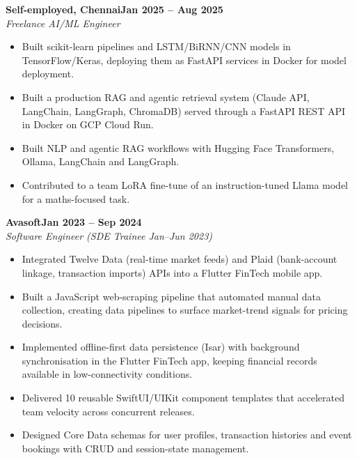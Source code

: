 \documentclass[a4paper,11pt]{article}
\newcommand{\entry}[4]{\needspace{4\baselineskip}\noindent\textbf{#1}\hfill\textbf{#2}\\ \textit{#3}\hfill\textit{#4}\par}
\begin{document}
\vspace{4pt}
\entry{Self-employed, Chennai}{Jan 2025 – Aug 2025}{Freelance AI/ML Engineer}{}
\begin{itemize}
  \item Built scikit-learn pipelines and LSTM/BiRNN/CNN models in TensorFlow/Keras, deploying them as FastAPI services in Docker for model deployment.
  \item Built a production RAG and agentic retrieval system (Claude API, LangChain, LangGraph, ChromaDB) served through a FastAPI REST API in Docker on GCP Cloud Run.
  \item Built NLP and agentic RAG workflows with Hugging Face Transformers, Ollama, LangChain and LangGraph.
  \item Contributed to a team LoRA fine-tune of an instruction-tuned Llama model for a maths-focused task.
\end{itemize}
\vspace{4pt}
\entry{Avasoft}{Jan 2023 – Sep 2024}{Software Engineer (SDE Trainee Jan–Jun 2023)}{}
\begin{itemize}
  \item Integrated Twelve Data (real-time market feeds) and Plaid (bank-account linkage, transaction imports) APIs into a Flutter FinTech mobile app.
  \item Built a JavaScript web-scraping pipeline that automated manual data collection, creating data pipelines to surface market-trend signals for pricing decisions.
  \item Implemented offline-first data persistence (Isar) with background synchronisation in the Flutter FinTech app, keeping financial records available in low-connectivity conditions.
  \item Delivered 10 reusable SwiftUI/UIKit component templates that accelerated team velocity across concurrent releases.
  \item Designed Core Data schemas for user profiles, transaction histories and event bookings with CRUD and session-state management.
\end{itemize}

\end{document}
